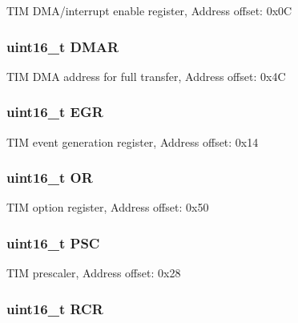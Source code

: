 T\-I\-M D\-M\-A/interrupt enable register, Address offset\-: 0x0\-C \hypertarget{struct_t_i_m___type_def_a30c2d8aa9c76dfba0b9a378b64700bda}{
\subsubsection[{D\-M\-A\-R}]{ uint16\-\_\-t D\-M\-A\-R}}\label{struct_t_i_m___type_def_a30c2d8aa9c76dfba0b9a378b64700bda}
T\-I\-M D\-M\-A address for full transfer, Address offset\-: 0x4\-C \hypertarget{struct_t_i_m___type_def_a980df1a5752e36604de4d71ce14fbfa3}{
\subsubsection[{E\-G\-R}]{ uint16\-\_\-t E\-G\-R}}\label{struct_t_i_m___type_def_a980df1a5752e36604de4d71ce14fbfa3}
T\-I\-M event generation register, Address offset\-: 0x14 \hypertarget{struct_t_i_m___type_def_a47766f433b160258ec05dbb6498fd271}{
\subsubsection[{O\-R}]{ uint16\-\_\-t O\-R}}\label{struct_t_i_m___type_def_a47766f433b160258ec05dbb6498fd271}
T\-I\-M option register, Address offset\-: 0x50 \hypertarget{struct_t_i_m___type_def_aba5df4ecbb3ecb97b966b188c3681600}{
\subsubsection[{P\-S\-C}]{ uint16\-\_\-t P\-S\-C}}\label{struct_t_i_m___type_def_aba5df4ecbb3ecb97b966b188c3681600}
T\-I\-M prescaler, Address offset\-: 0x28 \hypertarget{struct_t_i_m___type_def_aa0663aab6ed640b7594c8c6d32f6c1cd}{
\subsubsection[{R\-C\-R}]{ uint16\-\_\-t R\-C\-R}}\label{struct_t_i_m___type_def_aa0663aab6ed640b7594c8c6d32f6c1cd}
